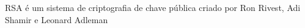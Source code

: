 \item [RSA] RSA é um sistema de criptografia de chave pública criado por Ron Rivest, Adi Shamir e Leonard Adleman

